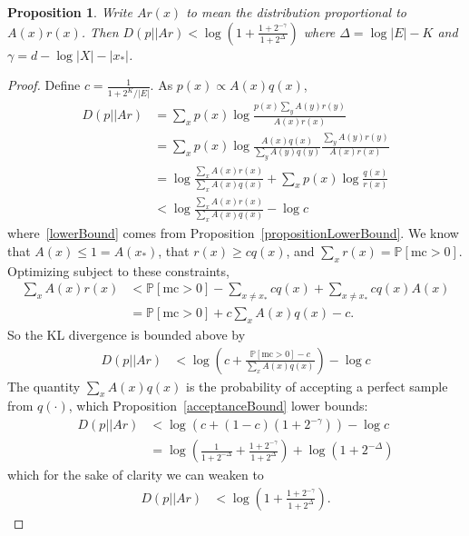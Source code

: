 \documentclass{article}
\newcommand{\Probability}{\mathds{P}} %
\newtheorem{proposition}{Proposition}
\begin{document}
    \begin{proposition}\label{mainResult}
    Write $Ar(x)$ to mean the distribution  proportional to $A(x)r(x)$. Then $D(p||Ar)<\log \left( 1 + \frac{1 + 2^{ - \gamma}}{1 + 2^\Delta}\right)$ where
    $\Delta = \log |E| - K$ and $\gamma = d - \log |X| - \lvert x_* \rvert $.
  \end{proposition}
  \begin{proof}
      Define $c=\frac{1}{1 + 2^K/|E|}$. As $p(x)\propto A(x)q(x)$,
    \begin{align}
      D(p||Ar)& = \sum_x p(x)\log \frac{p(x)\sum_y A(y)r(y)}{A(x)r(x)}\\
      & = \sum_x p(x)\log \frac{A(x)q(x)}{\sum_y A(y)q(y)}\frac{\sum_y A(y)r(y)}{A(x)r(x)} \\ %
      & = \log \frac{\sum_x A(x)r(x)}{\sum_x A(x)q(x)} + \sum_x p(x)\log \frac{q(x)}{r(x)}\\
      &  < \log \frac{\sum_x A(x)r(x)}{\sum_x A(x)q(x)} - \log c\label{lowerBound}
    \end{align}
    where~\ref{lowerBound} comes from Proposition~\ref{propositionLowerBound}.
    We know that $A(x)\leq 1 = A(x_*)$, that $r(x) \geq c q(x)$, and $\sum_x r(x) = \Probability [\text{mc} > 0 ]$.
    Optimizing subject to these constraints,
    \begin{align}
      \sum_x A(x) r(x) &  < \Probability [\text{mc} > 0] - \sum_{x\not= x_*} cq(x) +\sum_{x\not= x_*} cq(x)A(x)\nonumber\\
      & = \Probability [\text{mc} > 0 ] + c \sum_{x} A(x) q(x) - c.
    \end{align}
    So the KL divergence is bounded above by
    \begin{align}
      D(p||Ar)&  < \log \left( c + \frac{\Probability [\text{mc} > 0] -c }{\sum_x A(x)q(x)}\right) - \log c
    \end{align}
    The quantity $\sum_x A(x)q(x)$ is the probability of accepting a perfect sample from $q(\cdot )$,
    which Proposition~\ref{acceptanceBound} lower bounds:
    \begin{align}
      D(p||Ar)&  < \log \left( c + (1 -c)(1 + 2^{ - \gamma})\right) - \log c\\
      & = \log \left( \frac{1}{1 + 2^{ - \Delta}} + \frac{1 + 2^{ - \gamma}}{1 + 2^\Delta}\right)  + \log (1 + 2^{ - \Delta})
    \end{align}
    which for the sake of clarity we can weaken to%
    \begin{align}
      D(p||Ar)&  < \log \left( 1 + \frac{1 + 2^{ - \gamma}}{1 + 2^\Delta}\right) . %
    \end{align}
  \end{proof}
\end{document}
